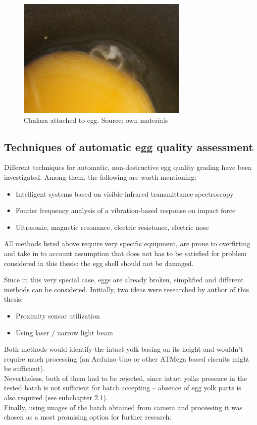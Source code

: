 \documentclass[12pt,twoside,a4paper]{article}
\begin{document}
 
\begin{figure}[H]
\centering
\includegraphics[width=0.4\paperwidth]{chalaza}
\caption{Chalaza attached to egg. Source: own materials}
\end{figure}


\subsection{Techniques of automatic egg quality assessment}

Different techniques for automatic, non-destructive egg quality grading have been investigated.
Among them, the following are worth mentioning:
\begin{itemize}
\item Intelligent systems based on visible-infrared transmittance spectroscopy\cite{agri}
\item Fourier frequency analysis of a vibration-based response on impact force\cite{svm} 
\item Ultrasonic, magnetic resonance, electric resistance, electric nose\cite{nondestr}  
\end{itemize}
All methods listed above require very specific equipment, are prone to overfitting and take in to account assumption that does not has to be satisfied for problem considered in this thesis: the egg shell should not be damaged.

Since in this very special case, eggs are already broken, simplified and different methods can be considered.
Initially, two ideas were researched by author of this thesis:
\begin{itemize}
\item Proximity sensor utilization
\item Using laser / narrow light beam 
\end{itemize}
Both methods would identify the intact yolk basing on its height and wouldn’t require much processing (an Arduino Uno or other ATMega based circuits might be sufficient).\\
Nevertheless, both of them had to be rejected, since intact yolks presence in the tested batch is not sufficient for batch accepting – absence of egg yolk parts is also required (see subchapter 2.1).\\
Finally, using images of the batch obtained from camera and processing it was chosen as a most promising option for further research.
\end{document}
